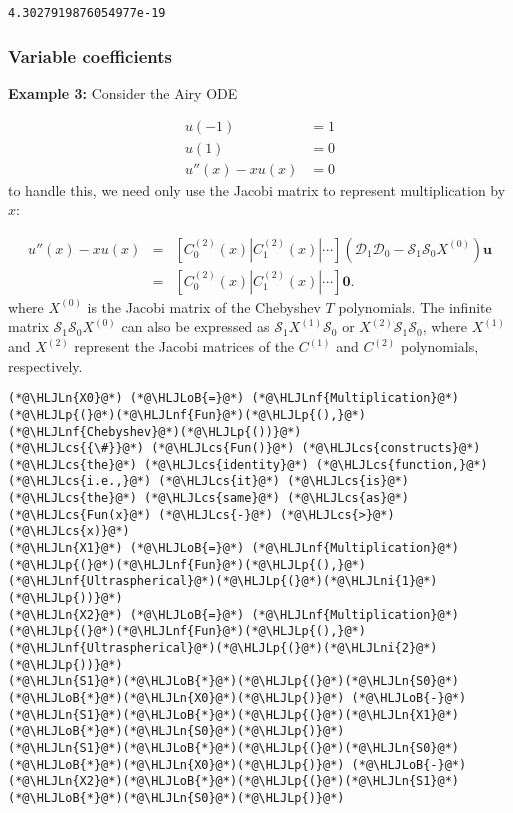 \documentclass[12pt,landscape]{article}
\newcommand{\HLJLn}[1]{#1}
\newcommand{\HLJLnf}[1]{\textcolor[RGB]{66,102,213}{#1}}
\newcommand{\HLJLni}[1]{\textcolor[RGB]{59,151,46}{#1}}
\newcommand{\HLJLoB}[1]{\textcolor[RGB]{102,102,102}{\textbf{#1}}}
\newcommand{\HLJLp}[1]{#1}
\newcommand{\HLJLcs}[1]{\textcolor[RGB]{153,153,119}{\textit{#1}}}
\begin{document}
{\begin{lstlisting}
4.3027919876054977e-19
\end{lstlisting}


\subsubsection{Variable coefficients}
\textbf{Example 3:} Consider the Airy ODE


\begin{align*}
u(-1) &= 1\\
u(1) &= 0\\
u''(x) - xu(x) &= 0
\end{align*}
to handle this, we need only use the Jacobi matrix to represent multiplication by $x$:


\begin{eqnarray*}
u''(x) - xu(x)  &=& \left[ C_0^{(2)}(x) | C_1^{(2)}(x) | \cdots \right]\left(\mathcal{D}_1\mathcal{D}_0  - \mathcal{S}_1\mathcal{S}_0X^{(0)}   \right) \mathbf{u} \\
 &=& \left[ C_0^{(2)}(x) | C_1^{(2)}(x) | \cdots \right]\mathbf{0}.
 \end{eqnarray*}
where $X^{(0)}$ is the Jacobi matrix of the Chebyshev $T$ polynomials. The infinite matrix $\mathcal{S}_1\mathcal{S}_0X^{(0)}$ can also be expressed as $\mathcal{S}_1X^{(1)}\mathcal{S}_0$ or $X^{(2)}\mathcal{S}_1\mathcal{S}_0$, where $X^{(1)}$ and $X^{(2)}$ represent the Jacobi matrices of the $C^{(1)}$ and $C^{(2)}$ polynomials, respectively. 


\begin{lstlisting}
(*@\HLJLn{X0}@*) (*@\HLJLoB{=}@*) (*@\HLJLnf{Multiplication}@*)(*@\HLJLp{(}@*)(*@\HLJLnf{Fun}@*)(*@\HLJLp{(),}@*)(*@\HLJLnf{Chebyshev}@*)(*@\HLJLp{())}@*)  
(*@\HLJLcs{{\#}}@*) (*@\HLJLcs{Fun()}@*) (*@\HLJLcs{constructs}@*) (*@\HLJLcs{the}@*) (*@\HLJLcs{identity}@*) (*@\HLJLcs{function,}@*) (*@\HLJLcs{i.e.,}@*) (*@\HLJLcs{it}@*) (*@\HLJLcs{is}@*) (*@\HLJLcs{the}@*) (*@\HLJLcs{same}@*) (*@\HLJLcs{as}@*) (*@\HLJLcs{Fun(x}@*) (*@\HLJLcs{-}@*) (*@\HLJLcs{>}@*) (*@\HLJLcs{x)}@*)
(*@\HLJLn{X1}@*) (*@\HLJLoB{=}@*) (*@\HLJLnf{Multiplication}@*)(*@\HLJLp{(}@*)(*@\HLJLnf{Fun}@*)(*@\HLJLp{(),}@*)(*@\HLJLnf{Ultraspherical}@*)(*@\HLJLp{(}@*)(*@\HLJLni{1}@*)(*@\HLJLp{))}@*)
(*@\HLJLn{X2}@*) (*@\HLJLoB{=}@*) (*@\HLJLnf{Multiplication}@*)(*@\HLJLp{(}@*)(*@\HLJLnf{Fun}@*)(*@\HLJLp{(),}@*)(*@\HLJLnf{Ultraspherical}@*)(*@\HLJLp{(}@*)(*@\HLJLni{2}@*)(*@\HLJLp{))}@*)
(*@\HLJLn{S1}@*)(*@\HLJLoB{*}@*)(*@\HLJLp{(}@*)(*@\HLJLn{S0}@*)(*@\HLJLoB{*}@*)(*@\HLJLn{X0}@*)(*@\HLJLp{)}@*) (*@\HLJLoB{-}@*) (*@\HLJLn{S1}@*)(*@\HLJLoB{*}@*)(*@\HLJLp{(}@*)(*@\HLJLn{X1}@*)(*@\HLJLoB{*}@*)(*@\HLJLn{S0}@*)(*@\HLJLp{)}@*)
(*@\HLJLn{S1}@*)(*@\HLJLoB{*}@*)(*@\HLJLp{(}@*)(*@\HLJLn{S0}@*)(*@\HLJLoB{*}@*)(*@\HLJLn{X0}@*)(*@\HLJLp{)}@*) (*@\HLJLoB{-}@*) (*@\HLJLn{X2}@*)(*@\HLJLoB{*}@*)(*@\HLJLp{(}@*)(*@\HLJLn{S1}@*)(*@\HLJLoB{*}@*)(*@\HLJLn{S0}@*)(*@\HLJLp{)}@*)
\end{lstlisting}

}
\end{document}
